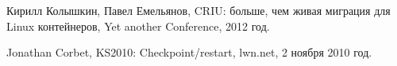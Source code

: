 \begin{thebibliography}{99}

    Кирилл Колышкин, Павел Емельянов, CRIU: больше, чем живая миграция для Linux контейнеров, Yet another Conference, 2012 год.

    Jonathan Corbet, KS2010: Checkpoint/restart, lwn.net, 2 ноября 2010 год.

\end{thebibliography}
